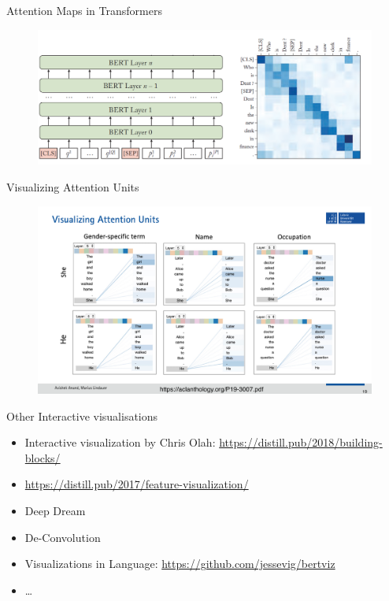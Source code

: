 \documentclass[11pt,compress,t,notes=noshow, aspectratio=169, xcolor=table]{beamer}
\begin{document}
\begin{frame}{Attention Maps in Transformers}
\begin{figure}
    \centering
    \includegraphics[scale=.4]{bild13}
\end{figure}
    
\end{frame}

\begin{frame}{Visualizing Attention Units}
    \begin{figure}
        \includegraphics[scale=.45]{slides/gradient-based/figure/iml-attention-vis.pdf}
    \end{figure}
\end{frame}

\begin{frame}{Other Interactive visualisations}
    \begin{itemize}
        \item Interactive visualization by Chris Olah: \url{https://distill.pub/2018/building-blocks/}
        \item \url{https://distill.pub/2017/feature-visualization/}
        \item Deep Dream
        \item De-Convolution
        \item Visualizations in Language: \url{https://github.com/jessevig/bertviz}
        \item \dots
    \end{itemize}
\end{frame}

\endlecture
\end{document}
